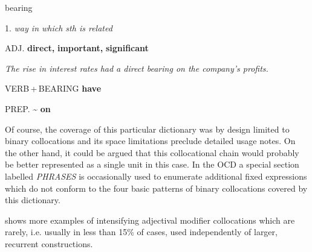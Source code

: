 \documentclass[output=paper]{langscibook}
\begin{document}
\ea
bearing

1. \textit{way in which sth is related}

ADJ. \textbf{direct,} \textbf{important,} \textbf{significant} 

\textit{The rise in interest rates had a direct bearing on the company's profits.}

VERB\,+\,BEARING  \textbf{have}

PREP. {\textasciitilde} \textbf{on}
\z

Of course, the coverage of this particular dictionary was by design limited to binary collocations and its space limitations preclude detailed usage notes. On the other hand, it could be argued that this collocational chain would probably be better represented as a single unit in this case. In the OCD a special section labelled \textit{PHRASES} is occasionally used to enumerate additional fixed expressions which do not conform to the four basic patterns of binary collocations covered by this dictionary.

 shows more examples of intensifying adjectival modifier collocations which are rarely, i.e. usually in less than 15\% of cases, used independently of larger, recurrent constructions. 
\end{document}

